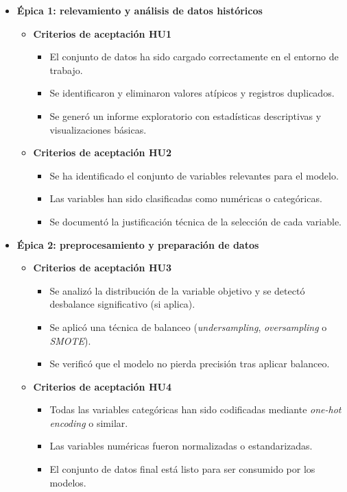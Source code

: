 \documentclass[
11pt, %
]{charter}
\begin{document}
\begin{itemize}
  \item \textbf{Épica 1: relevamiento y análisis de datos históricos}
    \begin{itemize}
      \item \textbf{Criterios de aceptación HU1}
      \begin{itemize}
        \item El conjunto de datos ha sido cargado correctamente en el entorno de trabajo.
        \item Se identificaron y eliminaron valores atípicos y registros duplicados.
        \item Se generó un informe exploratorio con estadísticas descriptivas y visualizaciones básicas.
      \end{itemize}
      \item \textbf{Criterios de aceptación HU2}
      \begin{itemize}
        \item Se ha identificado el conjunto de variables relevantes para el modelo.
        \item Las variables han sido clasificadas como numéricas o categóricas.
        \item Se documentó la justificación técnica de la selección de cada variable.
      \end{itemize}
    \end{itemize}

  \item \textbf{Épica 2: preprocesamiento y preparación de datos}
    \begin{itemize}
      \item \textbf{Criterios de aceptación HU3}
      \begin{itemize}
        \item Se analizó la distribución de la variable objetivo y se detectó desbalance significativo (si aplica).
        \item Se aplicó una técnica de balanceo (\textit{undersampling}, \textit{oversampling} o \textit{SMOTE}).
        \item Se verificó que el modelo no pierda precisión tras aplicar balanceo.
      \end{itemize}
      \item \textbf{Criterios de aceptación HU4}
      \begin{itemize}
        \item Todas las variables categóricas han sido codificadas mediante \textit{one-hot encoding} o similar.
        \item Las variables numéricas fueron normalizadas o estandarizadas.
        \item El conjunto de datos final está listo para ser consumido por los modelos.
      \end{itemize}
    \end{itemize}


\end{itemize}
\end{document}
